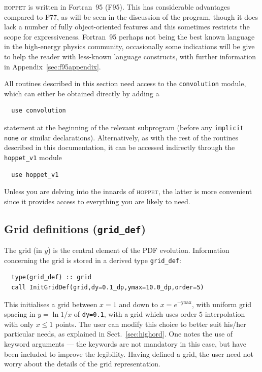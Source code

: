 \documentclass[12pt]{article}
\newcommand{\hoppet}{\textsc{hoppet}\xspace}
\newcommand{\ttt}[1]{\texttt{#1}}
\begin{document}
\hoppet is written in Fortran~95 (F95). This has considerable
advantages compared to F77, as will be seen in the discussion of the
program, though it does lack a number of fully object-oriented
features and this sometimes restricts the scope for expressiveness.
Fortran~95 perhaps not being the best known language in the
high-energy physics community, occasionally some indications will be give to
help the reader with less-known language constructs, with further
information in Appendix~\ref{sec:f95appendix}.

All routines described in this section need access to the
\texttt{convolution} module, which can either be obtained directly by
adding a 
\begin{lstlisting}
  use convolution
\end{lstlisting}
statement at the beginning of the relevant subprogram (before
any \ttt{implicit none} or similar declarations). Alternatively, as
with the rest of the routines described in this documentation, it can
be accessed indirectly through the \ttt{hoppet\_v1} module
\begin{lstlisting}
  use hoppet_v1
\end{lstlisting}
Unless you are delving into the innards of  \hoppet, the latter is
more convenient since it provides access to everything you are likely
to need.

\subsection{Grid definitions (\texttt{grid\_def})}
\label{sec:grid}

The grid (in $y$) is the central element of the PDF evolution.
Information concerning the grid is stored in a derived type
\texttt{grid\_def}:
\begin{lstlisting}
  type(grid_def) :: grid
  call InitGridDef(grid,dy=0.1_dp,ymax=10.0_dp,order=5)
\end{lstlisting}
This initialises a grid between $x=1$ and down to $x =
e^{-\texttt{ymax}}$, with uniform grid spacing in $y = \ln 1/x$ of
\texttt{dy=0.1}, with a grid which  uses order 5 interpolation
with only $x\le 1$ points.
The user can modify this choice to better
suit his/her particular needs, as explained
in Sect.~\ref{sec:highord}.
%
One notes 
the use of keyword arguments --- the keywords are not
mandatory in this case, but have been included to improve the
legibility. Having defined a grid, 
the user need not worry about the details of
the grid representation.
\end{document}
